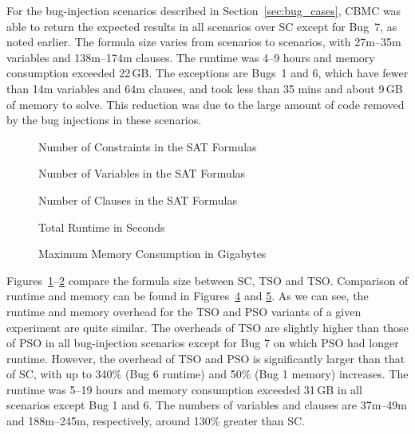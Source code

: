 For the bug-injection scenarios described in Section~\ref{sec:bug_cases}, CBMC
was able to return the expected results in all scenarios over SC except for Bug~7,
as noted earlier.
The formula size varies from scenarios to
scenarios, with 27m--35m variables and 138m--174m
clauses.  The runtime was 4--9 hours and memory consumption exceeded
22\,GB.  The exceptions are Bugs~1 and 6, which have fewer than
14m variables and 64m clauses, and took less than 35 mins and
about 9\,GB of memory to solve.  This reduction was due to the large amount
of code removed by the bug injections in these scenarios.

\begin{figure}[tbp]
\centering
\captionsetup{justification=centering}

\caption{Number of Constraints in the SAT Formulas}
\label{fig:barchart_sat_constr}
\end{figure}

\begin{figure}[tbp]
\centering
\captionsetup{justification=centering}

\caption{Number of Variables in the SAT Formulas}
\label{fig:barchart_sat_var}
\end{figure}

\begin{figure}[tbp]
\centering
\captionsetup{justification=centering}

\caption{Number of Clauses in the SAT Formulas}
\label{fig:barchart_sat_clause}
\end{figure}

\begin{figure}[tbp]
\centering
\captionsetup{justification=centering}

\caption{Total Runtime in Seconds}
\label{fig:barchart_runtime}
\end{figure}

\begin{figure}[tbp]
\centering
\captionsetup{justification=centering}

\caption{Maximum Memory Consumption in Gigabytes}
\label{fig:barchart_memory}
\end{figure}

Figures~\ref{fig:barchart_sat_constr}--\ref{fig:barchart_sat_var} 
compare the formula size between SC, TSO and TSO. Comparison of 
runtime and memory can be found in Figures~\ref{fig:barchart_runtime} 
and \ref{fig:barchart_memory}. As we can see,
the runtime and memory overhead for the TSO and PSO variants of a given experiment 
are quite similar.
The overheads of TSO
are slightly higher than those of PSO in all bug-injection scenarios except
for Bug 7 on which PSO had longer runtime.
However, the overhead of TSO and PSO is significantly larger than that of SC,
with up to 340\% (Bug 6 runtime) and 50\% (Bug 1 memory) increases.
The runtime was 5--19 hours and memory consumption exceeded
31\,GB in all scenarios except Bug 1 and 6.  The numbers of variables and
clauses are 37m--49m and 188m--245m, respectively, around 130\%
greater than SC.

